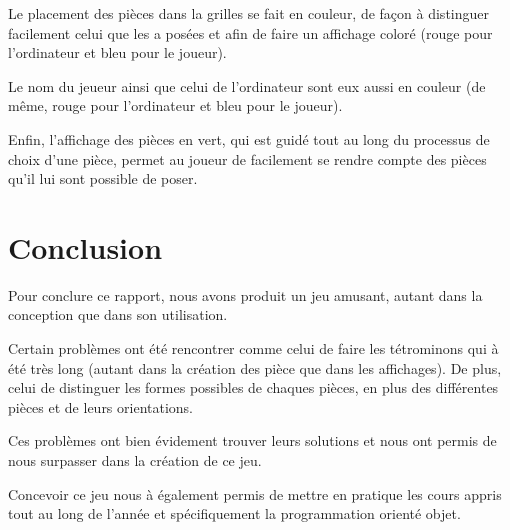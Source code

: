 \documentclass[a4paper, titlepage, french]{report}
\begin{document}
Le placement des pièces dans la grilles se fait en couleur, de façon à distinguer facilement celui que les a posées et afin de faire un affichage coloré (rouge pour l'ordinateur et bleu pour le joueur).
\bigskip

Le nom du jeueur ainsi que celui de l'ordinateur sont eux aussi en couleur (de même, rouge pour l'ordinateur et bleu pour le joueur).
\bigskip

Enfin, l'affichage des pièces en vert, qui est guidé tout au long du processus de choix d'une pièce, permet au joueur de facilement se rendre compte des pièces qu'il lui sont possible de poser.

 
\chapter{Conclusion}

Pour conclure ce rapport, nous avons produit un jeu amusant, autant dans la conception que dans son utilisation.
\bigskip

Certain problèmes ont été rencontrer comme celui de faire les tétrominons qui à été très long (autant dans la création des pièce que dans les affichages).
De plus, celui de distinguer les formes possibles de chaques pièces, en plus des différentes pièces et de leurs orientations.
\bigskip

Ces problèmes ont bien évidement trouver leurs solutions et nous ont permis de nous surpasser dans la création de ce jeu.
\bigskip

Concevoir ce jeu nous à également permis de mettre en pratique les cours appris tout au long de l'année et spécifiquement la programmation orienté objet.
\end{document}
